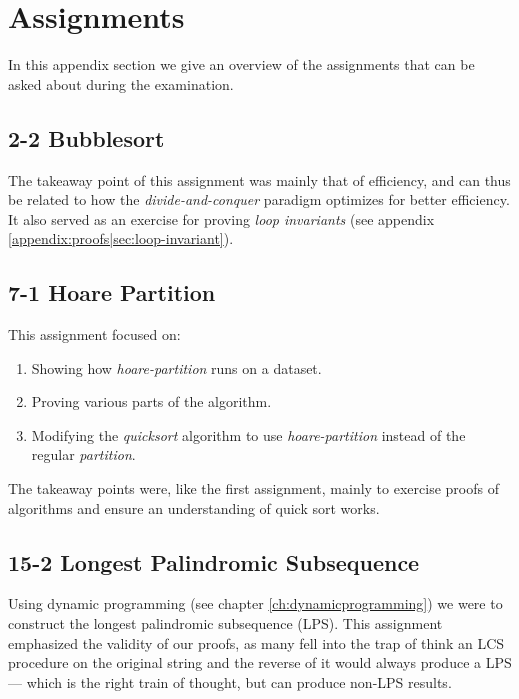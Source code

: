 
\thispagestyle{fancyplain}

\chapter{Assignments}
\label{appendix:assignments}
In this appendix section we give an overview of the assignments that can be
asked about during the examination.

\section{2-2 Bubblesort}
\label{appendix:assignments|ass:bubblesort}
The takeaway point of this assignment was mainly that of efficiency, and can
thus be related to how the \textit{divide-and-conquer} paradigm optimizes for
better efficiency. It also served as an exercise for proving \textit{loop
invariants} (see appendix \ref{appendix:proofs|sec:loop-invariant}).

\section{7-1 Hoare Partition}
\label{appendix:assignments|ass:hoare-partition}
This assignment focused on:
\begin{enumerate}
	\item Showing how \textit{hoare-partition} runs on a dataset.
	\item Proving various parts of the algorithm.
	\item Modifying the \textit{quicksort} algorithm to use
\textit{hoare-partition}  instead of the regular \textit{partition}.
\end{enumerate}
The takeaway points were, like the first assignment, mainly to exercise proofs
of algorithms and ensure an understanding of quick sort works.

\newpage
\section{15-2 Longest Palindromic Subsequence}
\label{appendix:assignments|ass:longest-palindromic-subsequence}
Using dynamic programming (see chapter \ref{ch:dynamicprogramming}) we were to
construct the longest palindromic subsequence (LPS). This assignment emphasized
the validity of our proofs, as many fell into the trap of think an LCS
procedure on the original string and the reverse of it would always produce a
LPS --- which is the right train of thought, but can produce non-LPS results.

